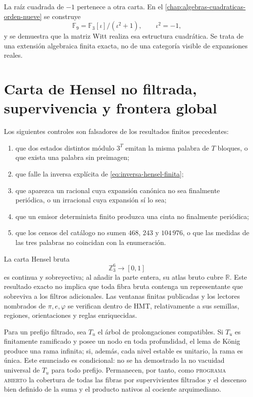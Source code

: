 La raíz cuadrada de \(-1\) pertenece a otra carta. En el
\cref{chap:algebras-cuadraticas-orden-nueve} se construye
\[
\mathbb F_9=\mathbb F_3[\iota]/(\iota^2+1),
\qquad \iota^2=-1,
\]
y se demuestra que la matriz Witt realiza esa estructura cuadrática. Se trata
de una extensión algebraica finita exacta, no de una categoría visible de
expansiones reales.

\section{Carta de Hensel no filtrada, supervivencia y frontera global}

Los siguientes controles son falsadores de los resultados finitos
precedentes:
\begin{enumerate}
\item que dos estados distintos módulo \(3^T\) emitan la misma palabra de
\(T\) bloques, o que exista una palabra sin preimagen;
\item que falle la inversa explícita de
\cref{eq:inversa-hensel-finita};
\item que aparezca un racional cuya expansión canónica no sea finalmente
periódica, o un irracional cuya expansión sí lo sea;
\item que un emisor determinista finito produzca una cinta no finalmente
periódica;
\item que los censos del catálogo no sumen \(468\), \(243\) y \(104\,976\),
o que las medidas de las tres palabras no coincidan con la enumeración.
\end{enumerate}

La carta Hensel bruta
\[
\mathbb Z_3^6\longrightarrow[0,1]
\]
es continua y sobreyectiva; al añadir la parte entera, su atlas bruto cubre
\(\mathbb R\). Este resultado exacto no implica que toda fibra bruta contenga
un representante que sobreviva a los filtros adicionales. Las ventanas
finitas publicadas y los lectores nombrados de \(\pi,e,\varphi\) se verifican
dentro de HMT, relativamente a sus semillas, regiones,
orientaciones y reglas enriquecidas.

\ifdefined\HMTInternalTraceability
Para un prefijo filtrado, sea \(T_u\) el árbol de prolongaciones compatibles.
Si \(T_u\) es finitamente ramificado y posee un nodo en toda profundidad, el
lema de König produce una rama infinita; si, además, cada nivel estable es
unitario, la rama es única. Este enunciado es condicional: no se ha demostrado
la no vacuidad universal de \(T_u\) para todo prefijo. Permanecen, por tanto,
como \textsc{programa abierto} la cobertura de todas las fibras por
supervivientes filtrados y el descenso bien definido de la suma y el producto
nativos al cociente arquimediano.
\fi
